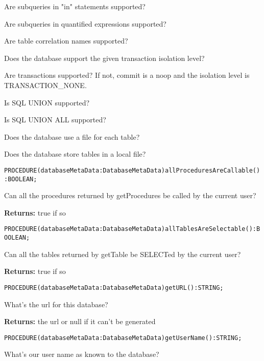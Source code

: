 \begin{description}
Are subqueries in "in" statements supported? 

Are subqueries in quantified expressions supported?

Are table correlation names supported? 

Does the database support the given transaction isolation level? 

Are transactions supported? If not, commit is a noop and the isolation level is TRANSACTION\_NONE. 

Is SQL UNION supported? 

Is SQL UNION ALL supported? 

Does the database use a file for each table? 

Does the database store tables in a local file? 

\end{description}





\verb'PROCEDURE(databaseMetaData:DatabaseMetaData)allProceduresAreCallable():BOOLEAN;'

Can all the procedures returned by getProcedures be called by the current user? 

{\bf Returns: } 
true if so 



\verb'PROCEDURE(databaseMetaData:DatabaseMetaData)allTablesAreSelectable():BOOLEAN;'

Can all the tables returned by getTable be SELECTed by the current user? 

{\bf Returns: } 
true if so 



\verb'PROCEDURE(databaseMetaData:DatabaseMetaData)getURL():STRING;'

What's the url for this database? 

{\bf Returns: } 
the url or null if it can't be generated 



\verb'PROCEDURE(databaseMetaData:DatabaseMetaData)getUserName():STRING;'

What's our user name as known to the database? 


